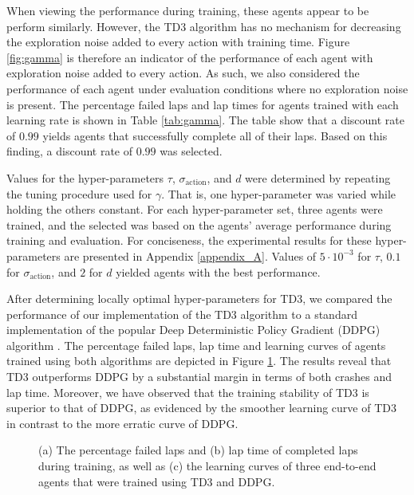 When viewing the performance during training, these agents appear to be perform similarly.
However, the TD3 algorithm has no mechanism for decreasing the exploration noise added to every action with training time.
Figure \ref{fig:gamma} is therefore an indicator of the performance of each agent with exploration noise added to every action.
As such, we also considered the performance of each agent under evaluation conditions where no exploration noise is present.
The percentage failed laps and lap times for agents trained with each learning rate is shown in Table \ref{tab:gamma}.
The table show that a discount rate of $0.99$ yields agents that successfully complete all of their laps. 
Based on this finding, a discount rate of $0.99$ was selected.



Values for the hyper-parameters $\tau$, $\sigma_{\text{action}}$, and $d$ were determined by repeating the tuning procedure used for $\gamma$. 
That is, one hyper-parameter was varied while holding the others constant.
For each hyper-parameter set, three agents were trained, and the selected was based on the agents' average performance during training and evaluation. 
For conciseness, the experimental results for these hyper-parameters are presented in Appendix \ref{appendix_A}. 
Values of $5\cdot10^{-3}$ for $\tau$, $0.1$ for $\sigma_{\text{action}}$, and $2$ for $d$ yielded agents with the best performance.


After determining locally optimal hyper-parameters for TD3, we compared the performance of our implementation of the TD3 algorithm to a standard implementation of the popular Deep Deterministic Policy Gradient (DDPG) algorithm  \cite{Ivanov2020, Capo2020, Niu2020}.
The percentage failed laps, lap time and learning curves of agents trained using both algorithms are depicted in Figure \ref{fig:learning_method}.
The results reveal that TD3 outperforms DDPG by a substantial margin in terms of both crashes and lap time.
Moreover, we have observed that the training stability of TD3 is superior to that of DDPG, as evidenced by the smoother learning curve of TD3 in contrast to the more erratic curve of DDPG.

\begin{figure}[htb!]
    \centering
    
    \caption[Learning curves showing for agents trained using TD3 and DDPG]{(a) The percentage failed laps and (b) lap time of completed laps during training, as well as (c) the learning curves of three end-to-end agents that were trained using TD3 and DDPG.}
    \label{fig:learning_method}
\end{figure}








